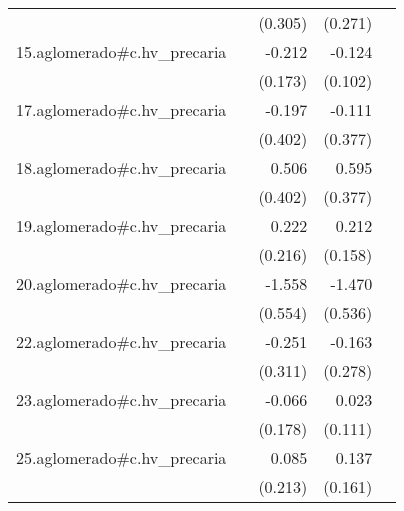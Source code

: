 {\begin{longtable}{l*{4}{D{.}{.}{-1}}}
            &                     &     (0.305)         &     (0.271)         &                     \\
\addlinespace
15.aglomerado#c.hv\_precaria&                     &      -0.212         &      -0.124         &                     \\
            &                     &     (0.173)         &     (0.102)         &                     \\
\addlinespace
17.aglomerado#c.hv\_precaria&                     &      -0.197         &      -0.111         &                     \\
            &                     &     (0.402)         &     (0.377)         &                     \\
\addlinespace
18.aglomerado#c.hv\_precaria&                     &       0.506         &       0.595         &                     \\
            &                     &     (0.402)         &     (0.377)         &                     \\
\addlinespace
19.aglomerado#c.hv\_precaria&                     &       0.222         &       0.212         &                     \\
            &                     &     (0.216)         &     (0.158)         &                     \\
\addlinespace
20.aglomerado#c.hv\_precaria&                     &      -1.558\sym{**} &      -1.470\sym{**} &                     \\
            &                     &     (0.554)         &     (0.536)         &                     \\
\addlinespace
22.aglomerado#c.hv\_precaria&                     &      -0.251         &      -0.163         &                     \\
            &                     &     (0.311)         &     (0.278)         &                     \\
\addlinespace
23.aglomerado#c.hv\_precaria&                     &      -0.066         &       0.023         &                     \\
            &                     &     (0.178)         &     (0.111)         &                     \\
\addlinespace
25.aglomerado#c.hv\_precaria&                     &       0.085         &       0.137         &                     \\
            &                     &     (0.213)         &     (0.161)         &                     \\

\end{longtable}}
